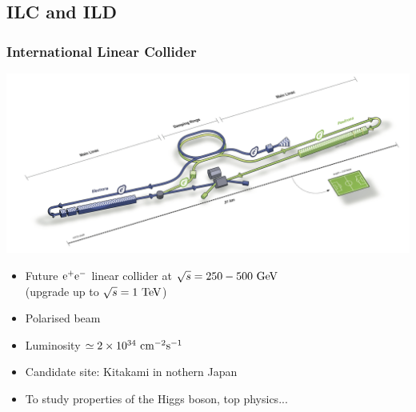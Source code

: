 \documentclass{beamer}
\begin{document}
    \subsection{ILC and ILD}

  \begin{frame}
    \frametitle{International Linear Collider}

    \vspace{-0.3cm}
    \begin{center}
      \includegraphics[width = 9 cm]{Pictures/ILC.png}
    \end{center}

    \vspace{-0.3cm}
    \begin{itemize}
      \item Future $\rm{e}^+\rm{e}^-$ linear collider at $\sqrt{s} = 250 - 500~\rm{GeV}$ \\ (upgrade up to $\sqrt{s} = 1~\rm{TeV}$)
      \item Polarised beam
      \item Luminosity $\simeq 2 \times 10^{34}~\rm{cm}^{-2}\rm{s}^{-1}$
      \item Candidate site: Kitakami in nothern Japan
      \item To study properties of the Higgs boson, top physics...
    \end{itemize}
  \end{frame}
 
\end{document}
